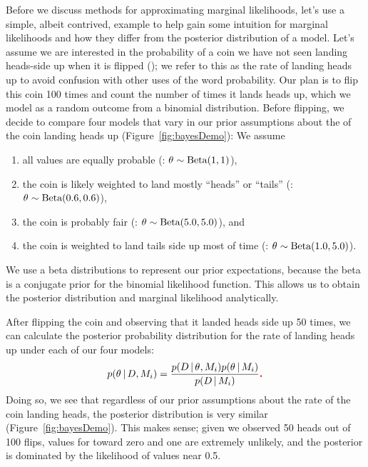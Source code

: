 Before we discuss methods for approximating marginal likelihoods, let's use a
simple, albeit contrived, example to help gain some intuition for marginal
likelihoods and how they differ from the posterior distribution of a model.
Let's assume we are interested in the probability of a coin we have not seen
landing heads-side up when it is flipped (\probheads);
we refer to this as the rate of landing heads up to avoid confusion with other
uses of the word probability.
Our plan is to flip this coin 100 times and count the number of times it lands
heads up, which we model as a random outcome from a binomial distribution.
Before flipping, we decide to compare four models that vary in our prior
assumptions about the   of the coin landing heads up
(Figure~\ref{fig:bayesDemo}):
We assume
\begin{enumerate}
    \item all values are equally probable
        (\coinmodel[1]: $\theta_{} \sim \textrm{Beta}(1, 1)$),
    \item the coin is likely weighted to land mostly ``heads'' or ``tails''
        (\coinmodel[2]: $\theta_{} \sim \textrm{Beta}(0.6, 0.6)$),
    \item the coin is probably fair
        (\coinmodel[3]: $\theta_{} \sim \textrm{Beta}(5.0, 5.0)$), and
    \item the coin is weighted to land tails side up most of time
        (\coinmodel[4]: $\theta_{} \sim \textrm{Beta}(1.0, 5.0)$).
\end{enumerate}
We use a beta distributions to represent our prior expectations, because the
beta is a conjugate prior for the binomial likelihood function.
This allows us to obtain the posterior distribution and marginal likelihood
analytically.

\begin{linenomath}
After flipping the coin and observing that it landed heads side up 50 times, we
can calculate the posterior probability distribution for the rate of landing
heads up under each of our four models:
\begin{equation}
    p(\probheads \given \flipdata, \coinmodel[i]) = \frac{
        p(\flipdata \given \probheads, \coinmodel[i]) p(\probheads \given \coinmodel[i])
    }{
        p(\flipdata \given \coinmodel[i])
    } \vmadd{.}
    \label{eq:coinBayesRule}
\end{equation}
Doing so, we see that regardless of our prior assumptions about the rate of the
coin landing heads, the posterior distribution is very similar
(Figure~\ref{fig:bayesDemo}).
This makes sense; given we observed 50 heads out of 100 flips, values for
\probheads toward zero and one are extremely unlikely, and the posterior is
dominated by the likelihood of values near 0.5.
\end{linenomath}

